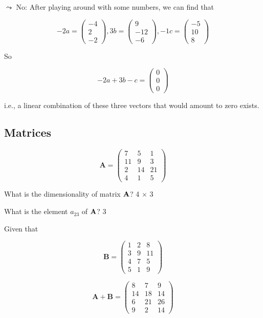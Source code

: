 \documentclass[
  letterpaper,
]{book}
\theoremstyle{definition}
\theoremstyle{definition}
\theoremstyle{plain}
\theoremstyle{definition}
\theoremstyle{plain}
\theoremstyle{plain}
\theoremstyle{remark}
\begin{document}
\(\leadsto\) No: After playing around with some numbers, we can find
that

\[-2a = \begin{pmatrix} -4\\ 2\\ -2 \end{pmatrix}, 3b = \begin{pmatrix} 9\\ -12\\ -6 \end{pmatrix}, -1c = \begin{pmatrix} -5\\ 10\\ 8 \end{pmatrix}\]

So

\[-2a + 3b - c = \begin{pmatrix} 0 \\ 0 \\ 0 \end{pmatrix}\]

i.e., a linear combination of these three vectors that would amount to
zero exists.

\hypertarget{matrices-1}{%
\subsection*{Matrices}\label{matrices-1}}

\[\mathbf{A}=\begin{pmatrix} 7 & 5 & 1 \\ 11 & 9 & 3 \\ 2 & 14 & 21 \\ 4 & 1 & 5 \end{pmatrix}\]

What is the dimensionality of matrix \({\bf A}\)? 4 \(\times\) 3

What is the element \(a_{23}\) of \({\bf A}\)? 3

Given that

\[\mathbf{B}=\begin{pmatrix} 1 & 2 & 8 \\ 3 & 9 & 11 \\ 4 & 7 & 5 \\ 5 & 1 & 9 \end{pmatrix}\]

\[\mathbf{A} + \mathbf{B} = \begin{pmatrix} 8 & 7 & 9 \\ 14 & 18 & 14 \\ 6 & 21 & 26 \\ 9 & 2 & 14 \end{pmatrix}\]
\end{document}
